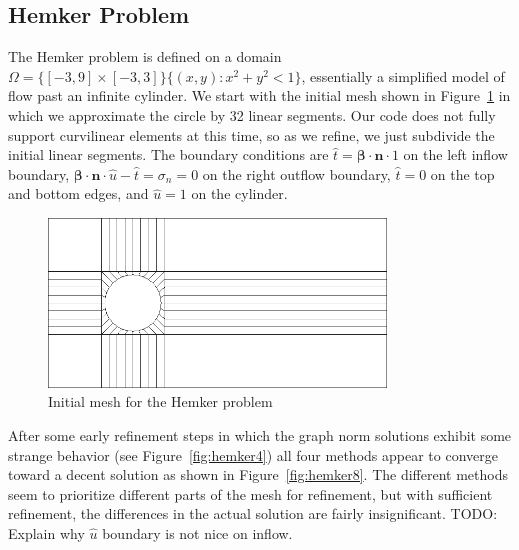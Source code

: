 \documentclass[letterpaper]{article}
\def\bbeta{\boldsymbol\beta}
\begin{document}
\subsection{Hemker Problem}
The Hemker problem is defined on a domain
$\Omega=\{[-3,9]\times[-3,3]\}\{(x,y):x^2+y^2<1\}$, essentially a simplified
model of flow past an infinite cylinder. We start with the initial mesh shown
in Figure~\ref{fig:hemkerInitial} in which we approximate the circle by 32
linear segments. Our code does not fully support curvilinear elements at this
time, so as we refine, we just subdivide the initial linear segments. The
boundary conditions are $\hat t=\bbeta\cdot\mathbf{n}\cdot 1$ on the left
inflow boundary, $\bbeta\cdot\mathbf{n}\cdot\hat u-\hat t=\sigma_n=0$ on the
right outflow boundary, $\hat t=0$ on the top and bottom edges, and $\hat u=1$
on the cylinder.

\begin{figure}[h!]
\centering
\includegraphics[width=0.8\textwidth]{figs/Hemker/initial_mesh.png}
\caption{Initial mesh for the Hemker problem}
\label{fig:hemkerInitial}
\end{figure}

After some early refinement steps in which the graph norm solutions exhibit
some strange behavior (see Figure~\ref{fig:hemker4}) all four methods appear
to converge toward a decent solution as shown in Figure~\ref{fig:hemker8}. The
different methods seem to prioritize different parts of the mesh for
refinement, but with sufficient refinement, the differences in the actual
solution are fairly insignificant. TODO: Explain why $\hat u$ boundary is not
nice on inflow.
\end{document}
